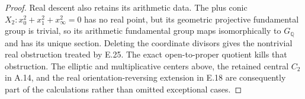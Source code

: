 \begin{proof}
Real descent also retains its arithmetic data. The plus conic
$X_2:x_0^2+x_1^2+x_\infty^2=0$ has no real point, but its
geometric projective fundamental group is trivial, so its arithmetic
fundamental group maps isomorphically to $G_{\mathbb Q}$ and has
its unique section. Deleting the coordinate divisors gives the
nontrivial real obstruction treated by E.25. The exact open-to-proper
quotient kills that obstruction. The elliptic and multiplicative
centers above, the retained central $C_2$ in A.14, and the real
orientation-reversing extension in E.18 are consequently part of
the calculations rather than omitted exceptional cases.
\end{proof}
